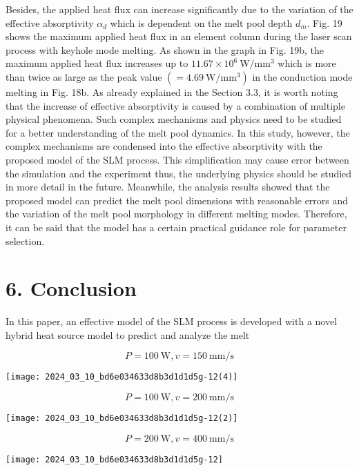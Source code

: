 \documentclass[10pt]{article}
\begin{document}
Besides, the applied heat flux can increase significantly due to the variation of the effective absorptivity $\alpha_{d}$ which is dependent on the melt pool depth $d_{m}$. Fig. 19 shows the maximum applied heat flux in an element column during the laser scan process with keyhole mode melting. As shown in the graph in Fig. 19b, the maximum applied heat flux increases up to $11.67 \times 10^{6} \mathrm{~W} / \mathrm{mm}^{3}$ which is more than twice as large as the peak value $\left(=4.69 \mathrm{~W} / \mathrm{mm}^{3}\right)$ in the conduction mode melting in Fig. 18b. As already explained in the Section 3.3, it is worth noting that the increase of effective absorptivity is caused by a combination of multiple physical phenomena. Such complex mechanisms and physics need to be studied for a better understanding of the melt pool dynamics. In this study, however, the complex mechanisms are condensed into the effective absorptivity with the proposed model of the SLM process. This simplification may cause error between the simulation and the experiment thus, the underlying physics should be studied in more detail in the future. Meanwhile, the analysis results showed that the proposed model can predict the melt pool dimensions with reasonable errors and the variation of the melt pool morphology in different melting modes. Therefore, it can be said that the model has a certain practical guidance role for parameter selection.

\section*{6. Conclusion}
In this paper, an effective model of the SLM process is developed with a novel hybrid heat source model to predict and analyze the melt

$$
P=100 \mathrm{~W}, v=150 \mathrm{~mm} / \mathrm{s}
$$

\begin{center}
\texttt{[image: 2024\_03\_10\_bd6e034633d8b3d1d1d5g-12(4)]}
\end{center}

$$
P=100 \mathrm{~W}, v=200 \mathrm{~mm} / \mathrm{s}
$$

\begin{center}
\texttt{[image: 2024\_03\_10\_bd6e034633d8b3d1d1d5g-12(2)]}
\end{center}

$$
P=200 \mathrm{~W}, v=400 \mathrm{~mm} / \mathrm{s}
$$

\begin{center}
\texttt{[image: 2024\_03\_10\_bd6e034633d8b3d1d1d5g-12]}
\end{center}
\end{document}
